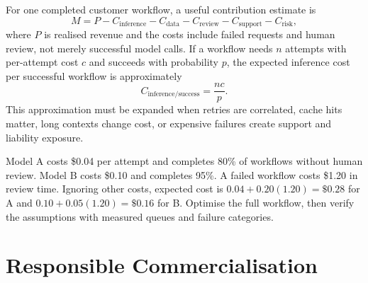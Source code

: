 For one completed customer workflow, a useful contribution estimate is
\begin{equation}
  M = P - C_{\mathrm{inference}} - C_{\mathrm{data}}
      - C_{\mathrm{review}} - C_{\mathrm{support}} - C_{\mathrm{risk}},
\end{equation}
where $P$ is realised revenue and the costs include failed requests and human
review, not merely successful model calls.
If a workflow needs $n$ attempts with per-attempt cost $c$ and succeeds with
probability $p$, the expected inference cost per successful workflow is
approximately
\begin{equation}
  C_{\mathrm{inference/success}} = \frac{n c}{p}.
\end{equation}
This approximation must be expanded when retries are correlated, cache hits
matter, long contexts change cost, or expensive failures create support and
liability exposure.

\begin{workedexample}
Model A costs \$0.04 per attempt and completes 80\% of workflows without human
review.
Model B costs \$0.10 and completes 95\%.
A failed workflow costs \$1.20 in review time.
Ignoring other costs, expected cost is
$0.04 + 0.20(1.20)=\$0.28$ for A and
$0.10 + 0.05(1.20)=\$0.16$ for B.
Optimise the full workflow, then verify the assumptions with measured queues
and failure categories.
\end{workedexample}

\section{Responsible Commercialisation}

